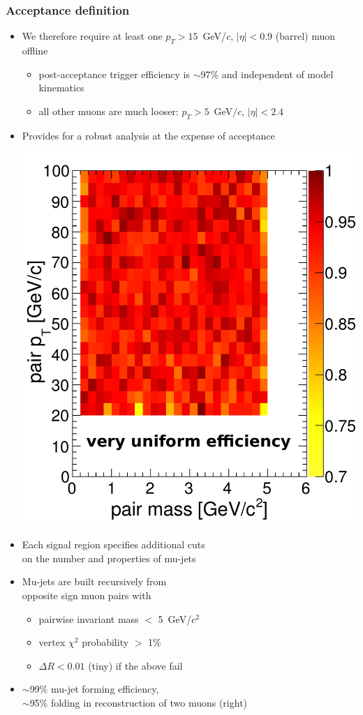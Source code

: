 \documentclass[compress]{beamer}
\begin{document}
\begin{frame}
\frametitle{Acceptance definition}

\begin{itemize}
\item We therefore require at least one $p_T > 15$~GeV/$c$, $|\eta| <
  0.9$ (barrel) muon offline
\begin{itemize}
\item post-acceptance trigger efficiency is $\sim$97\% and independent
  of model kinematics
\item all other muons are much looser: $p_T > 5$~GeV$/c$, $|\eta| < 2.4$
\end{itemize}

\item Provides for a robust analysis at the expense of acceptance

\hfill \mbox{\includegraphics[width=0.37\linewidth]{eff_mujetreco_inplateau_masspt.pdf}\hspace{-0.5 cm}}

\vspace{-4.3 cm}
\item Each signal region specifies additional cuts \\ on the number and
  properties of mu-jets

\item Mu-jets are built recursively from \\ opposite sign muon pairs with
\begin{itemize}
\item pairwise invariant mass $<$ 5~GeV/$c^2$
\item vertex $\chi^2$ probability $>$ 1\%
\item $\Delta R < 0.01$ (tiny) if the above fail
\end{itemize}

\item $\sim$99\% mu-jet forming efficiency, \\ $\sim$95\% folding in
  reconstruction of two muons (right)
\end{itemize}
\end{frame}
\end{document}

